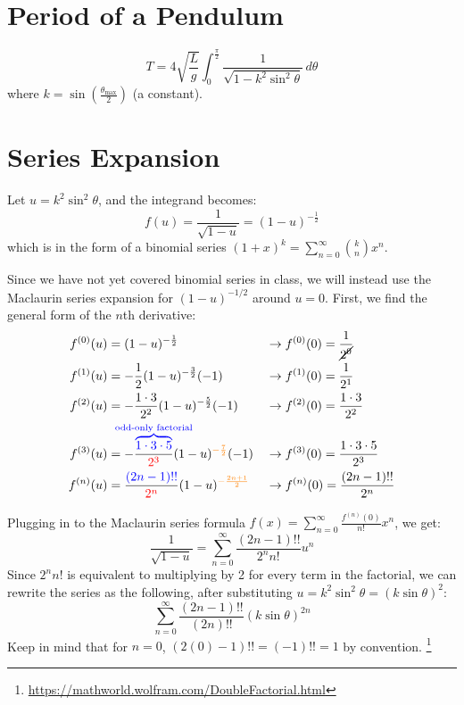 \documentclass[12pt]{article}
\begin{document}
\section{Period of a Pendulum}
\[
  T = 4 \sqrt{\frac{L}{g}} \int_{0}^{\frac{\pi}{2}} \frac{1}{\sqrt{1 - k^2
  \sin^2 \theta}} \, d\theta
\]
where $k = \sin\left(\frac{\theta_{\mathrm{max}}}{2}\right)$ (a constant).

\section{Series Expansion}
Let $u = k^2 \sin^2 \theta$, and the integrand becomes:
\[
  f(u) = \frac{1}{\sqrt{1 - u}} = (1 - u)^{-\frac{1}{2}}
\]
which is in the form of a binomial series $(1+x)^k =
\sum_{n=0}^{\infty} \binom{k}{n} x^n$.

Since we have not yet covered binomial series in class, we will instead
use the Maclaurin series expansion for $(1 - u)^{-1/2}$ around $u =
0$. First, we find the general form of the $n$th derivative:
\begin{align*}
  f^{(0)}(u) &= (1-u)^{-\frac{1}{2}} &&\rightarrow f^{(0)}(0) =
  \frac{1}{\cancel{2^0}} \\
  f^{(1)}(u) &= -\frac{1}{2} (1-u)^{-\frac{3}{2}} (-1) &&\rightarrow
  f^{(1)}(0) = \frac{1}{2^1} \\
  f^{(2)}(u) &= -\frac{1\cdot3}{2^2} (1-u)^{-\frac{5}{2}} (-1)
  &&\rightarrow f^{(2)}(0) = \frac{1\cdot3}{2^2} \\
  f^{(3)}(u) &=
  -\frac{\color{blue}\overbrace{1\cdot3\cdot5}^{\mathclap{\text{odd-only
  factorial}}}}{\color{red}2^3} (1-u)^{\color{orange} -\frac{7}{2}} (-1)
  &&\rightarrow f^{(3)}(0) =
  \frac{1\cdot3\cdot5}{2^3} \\
  f^{(n)}(u) &= \frac{{\color{blue}(2n-1)!!}}{{\color{red}2^n}}
  (1-u)^{\color{orange} -\frac{2n+1}{2}}
  &&\rightarrow f^{(n)}(0) = \frac{{(2n-1)!!}}{{2^n}}
\end{align*}

Plugging in to the Maclaurin series formula $f(x) =
\sum_{n=0}^{\infty} \frac{f^{(n)}(0)}{n!} x^n$, we get:
\[
  \frac{1}{\sqrt{1 - u}} = \sum_{n=0}^{\infty} \frac{
  (2n-1)!!}{2^n n!} u^n
\]
Since $2^n n!$ is equivalent to multiplying by 2 for every term in
the factorial, we can rewrite the series as the following, after
substituting $u = k^2 \sin^2 \theta = (k\sin\theta)^2$:
\[
  \sum_{n=0}^{\infty} \frac{(2n-1)!!}{(2n)!!}
  {\left(k\sin\theta\right)}^{2n}
\]
Keep in mind that for $n = 0$, $(2(0) - 1)!! = (-1)!! = 1$ by
convention. \footnote{\url{https://mathworld.wolfram.com/DoubleFactorial.html}}
\end{document}
